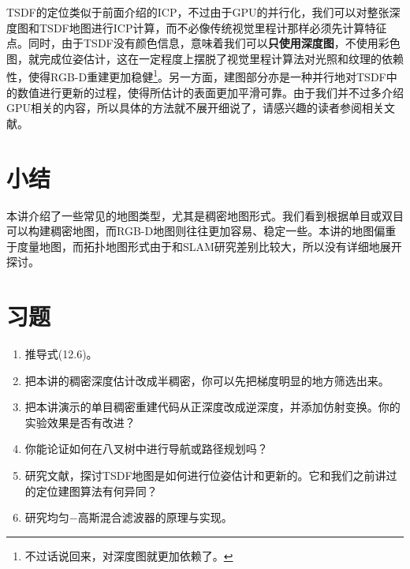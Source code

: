 TSDF的定位类似于前面介绍的ICP，不过由于GPU的并行化，我们可以对整张深度图和TSDF地图进行ICP计算，而不必像传统视觉里程计那样必须先计算特征点。同时，由于TSDF没有颜色信息，意味着我们可以\textbf{只使用深度图}，不使用彩色图，就完成位姿估计，这在一定程度上摆脱了视觉里程计算法对光照和纹理的依赖性，使得RGB-D重建更加稳健\footnote{不过话说回来，对深度图就更加依赖了。}。另一方面，建图部分亦是一种并行地对TSDF中的数值进行更新的过程，使得所估计的表面更加平滑可靠。由于我们并不过多介绍GPU相关的内容，所以具体的方法就不展开细说了，请感兴趣的读者参阅相关文献。

\section{小结}
本讲介绍了一些常见的地图类型，尤其是稠密地图形式。我们看到根据单目或双目可以构建稠密地图，而RGB-D地图则往往更加容易、稳定一些。本讲的地图偏重于度量地图，而拓扑地图形式由于和SLAM研究差别比较大，所以没有详细地展开探讨。

\section*{习题}
\begin{enumerate}
	\item 推导式(12.6)。
	\item 把本讲的稠密深度估计改成半稠密，你可以先把梯度明显的地方筛选出来。
	\item[\optional] 把本讲演示的单目稠密重建代码从正深度改成逆深度，并添加仿射变换。你的实验效果是否有改进？
	\item 你能论证如何在八叉树中进行导航或路径规划吗？
	\item 研究文献\cite{Newcombe2011}，探讨TSDF地图是如何进行位姿估计和更新的。它和我们之前讲过的定位建图算法有何异同？
	\item[\optional] 研究均匀−高斯混合滤波器的原理与实现。
\end{enumerate}
